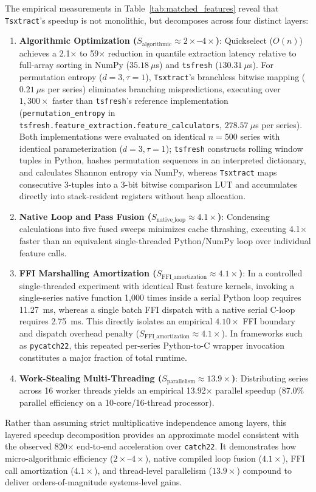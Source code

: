 \documentclass[conference]{IEEEtran}
\newcommand{\tsxtract}{\texttt{Tsxtract}}
\newcommand{\tsfresh}{\texttt{tsfresh}}
\newcommand{\catchtwentytwo}{\texttt{catch22}}
\begin{document}
The empirical measurements in Table~\ref{tab:matched_features} reveal that \tsxtract{}'s speedup is not monolithic, but decomposes across four distinct layers:
\begin{enumerate}
    \item \textbf{Algorithmic Optimization ($S_{\text{algorithmic}} \approx 2\times$--$4\times$)}: Quickselect ($O(n)$) achieves a 2.1$\times$ to 59$\times$ reduction in quantile extraction latency relative to full-array sorting in NumPy ($35.18~\mu$s) and \tsfresh{} ($130.31~\mu$s). For permutation entropy ($d=3, \tau=1$), \tsxtract{}'s branchless bitwise mapping ($0.21~\mu$s per series) eliminates branching mispredictions, executing over $1,300\times$ faster than \tsfresh{}'s reference implementation (\texttt{permutation\_entropy} in \texttt{tsfresh.feature\_extraction.feature\_calculators}, $278.57~\mu$s per series). Both implementations were evaluated on identical $n=500$ series with identical parameterization ($d=3, \tau=1$); \tsfresh{} constructs rolling window tuples in Python, hashes permutation sequences in an interpreted dictionary, and calculates Shannon entropy via NumPy, whereas \tsxtract{} maps consecutive 3-tuples into a 3-bit bitwise comparison LUT and accumulates directly into stack-resident registers without heap allocation.
    \item \textbf{Native Loop and Pass Fusion ($S_{\text{native\_loop}} \approx 4.1\times$)}: Condensing calculations into five fused sweeps minimizes cache thrashing, executing 4.1$\times$ faster than an equivalent single-threaded Python/NumPy loop over individual feature calls.
    \item \textbf{FFI Marshalling Amortization ($S_{\text{FFI\_amortization}} \approx 4.1\times$)}: In a controlled single-threaded experiment with identical Rust feature kernels, invoking a single-series native function 1,000 times inside a serial Python loop requires 11.27~ms, whereas a single batch FFI dispatch with a native serial C-loop requires 2.75~ms. This directly isolates an empirical $4.10\times$ FFI boundary and dispatch overhead penalty ($S_{\text{FFI\_amortization}} \approx 4.1\times$). In frameworks such as \texttt{pycatch22}, this repeated per-series Python-to-C wrapper invocation constitutes a major fraction of total runtime.
    \item \textbf{Work-Stealing Multi-Threading ($S_{\text{parallelism}} \approx 13.9\times$)}: Distributing series across 16 worker threads yields an empirical 13.92$\times$ parallel speedup (87.0\% parallel efficiency on a 10-core/16-thread processor).
\end{enumerate}
Rather than assuming strict multiplicative independence among layers, this layered speedup decomposition provides an approximate model consistent with the observed 820$\times$ end-to-end acceleration over \catchtwentytwo{}. It demonstrates how micro-algorithmic efficiency ($2\times\text{--}4\times$), native compiled loop fusion ($4.1\times$), FFI call amortization ($4.1\times$), and thread-level parallelism ($13.9\times$) compound to deliver orders-of-magnitude systems-level gains.
\end{document}

